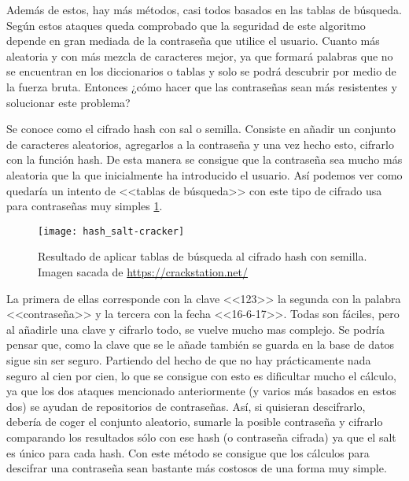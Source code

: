 Además de estos, hay más métodos, casi todos basados en las tablas de búsqueda. Según estos ataques queda comprobado que la seguridad de este algoritmo depende en gran mediada de la contraseña que utilice el usuario. Cuanto más aleatoria y con más mezcla de caracteres mejor, ya que formará palabras que no se encuentran en los diccionarios o tablas y solo se podrá descubrir por medio de la fuerza bruta. Entonces ¿cómo hacer que las contraseñas sean más resistentes y solucionar este problema?

Se conoce como el cifrado hash con sal o semilla. Consiste en añadir un conjunto de caracteres aleatorios, agregarlos a la contraseña y una vez hecho esto, cifrarlo con la función hash. De esta manera se consigue que la contraseña sea mucho más aleatoria que la que inicialmente ha introducido el usuario. Así podemos ver como quedaría un intento de <<tablas de búsqueda>> con este tipo de cifrado usa para contraseñas muy simples \ref{fig:3.3}. 

\begin{figure}[h]
\centering
\texttt{[image: hash\_salt-cracker]}
\caption{Resultado de aplicar tablas de búsqueda al cifrado hash con semilla. Imagen sacada de \url{https://crackstation.net/}}
\label{fig:3.3}
\end{figure}

La primera de ellas corresponde con la clave <<123>> la segunda con la palabra <<contraseña>> y la tercera con la fecha <<16-6-17>>. Todas son fáciles, pero al añadirle una clave y cifrarlo todo, se vuelve mucho mas complejo. Se podría pensar que, como la clave que se le añade también se guarda en la base de datos sigue sin ser seguro. Partiendo del hecho de que no hay prácticamente nada seguro al cien por cien, lo que se consigue con esto es dificultar mucho el cálculo, ya que los dos ataques mencionado anteriormente (y varios más basados en estos dos) se ayudan de repositorios de contraseñas. Así, si quisieran descifrarlo, debería de coger el conjunto aleatorio, sumarle la posible contraseña y cifrarlo comparando los resultados sólo con ese hash (o contraseña cifrada) ya que el salt es único para cada hash. Con este método se consigue que los cálculos para descifrar una contraseña sean bastante más costosos de una forma muy simple.
